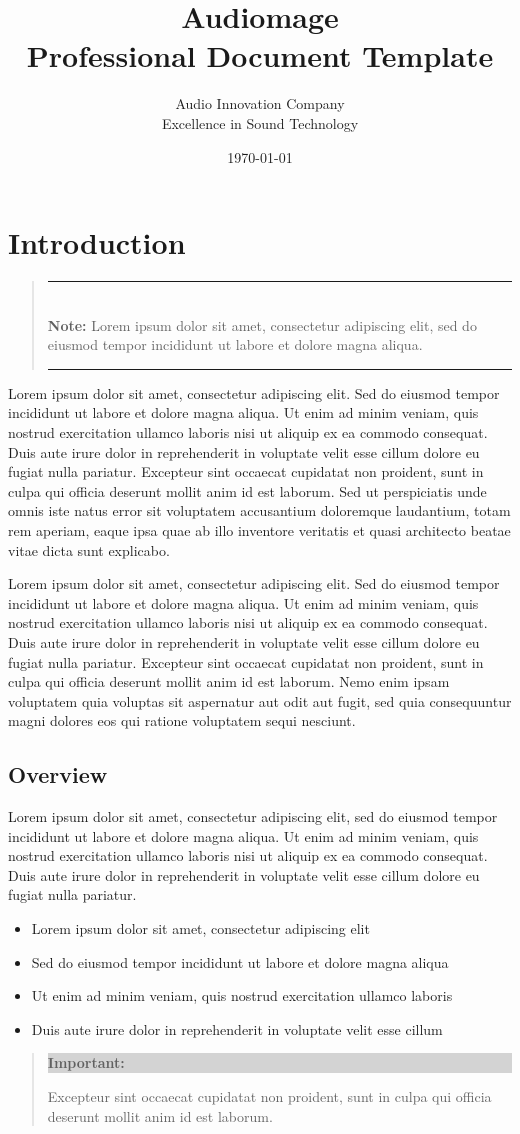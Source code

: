 \documentclass[11pt,a4paper]{article}
\title{
  \vspace{-2cm}
  \textcolor{audiomageblue}{\Huge\bfseries Audiomage}\\
  \vspace{0.5cm}
  \textcolor{secondary}{\Large Professional Document Template}
  \vspace{1cm}
}
\author{
  \textcolor{secondary}{\Large Audio Innovation Company}\\
  \textcolor{secondary}{\normalsize Excellence in Sound Technology}
}
\date{\textcolor{secondary}{\today}}
\newcommand{\loremtext}[1]{%
  Lorem ipsum dolor sit amet, consectetur adipiscing elit. Sed do eiusmod tempor incididunt ut labore et dolore magna aliqua. Ut enim ad minim veniam, quis nostrud exercitation ullamco laboris nisi ut aliquip ex ea commodo consequat. Duis aute irure dolor in reprehenderit in voluptate velit esse cillum dolore eu fugiat nulla pariatur. Excepteur sint occaecat cupidatat non proident, sunt in culpa qui officia deserunt mollit anim id est laborum.%
}
\newenvironment{keypoint}%
{\begin{quote}\textcolor{audiomageblue}{\rule{\textwidth}{1pt}}\vspace{0.2em}\\\textbf{Note:} }%
{\vspace{0.2em}\\\textcolor{audiomageblue}{\rule{\textwidth}{1pt}}\end{quote}}
\newenvironment{highlight}%
{\begin{quote}\colorbox{lightgray}{\parbox{\dimexpr\linewidth-2\fboxsep}{\textbf{Important:} }}}%
{\end{quote}}
\begin{document}
\maketitle
\thispagestyle{empty}

\newpage
\tableofcontents
\newpage

\section{Introduction}

\begin{keypoint}
Lorem ipsum dolor sit amet, consectetur adipiscing elit, sed do eiusmod tempor incididunt ut labore et dolore magna aliqua.
\end{keypoint}

\loremtext{1} Sed ut perspiciatis unde omnis iste natus error sit voluptatem accusantium doloremque laudantium, totam rem aperiam, eaque ipsa quae ab illo inventore veritatis et quasi architecto beatae vitae dicta sunt explicabo. 

\loremtext{2} Nemo enim ipsam voluptatem quia voluptas sit aspernatur aut odit aut fugit, sed quia consequuntur magni dolores eos qui ratione voluptatem sequi nesciunt.

\subsection{Overview}

Lorem ipsum dolor sit amet, consectetur adipiscing elit, sed do eiusmod tempor incididunt ut labore et dolore magna aliqua. Ut enim ad minim veniam, quis nostrud exercitation ullamco laboris nisi ut aliquip ex ea commodo consequat. Duis aute irure dolor in reprehenderit in voluptate velit esse cillum dolore eu fugiat nulla pariatur.

\begin{itemize}
  \item Lorem ipsum dolor sit amet, consectetur adipiscing elit
  \item Sed do eiusmod tempor incididunt ut labore et dolore magna aliqua
  \item Ut enim ad minim veniam, quis nostrud exercitation ullamco laboris
  \item Duis aute irure dolor in reprehenderit in voluptate velit esse cillum
\end{itemize}

\begin{highlight}
Excepteur sint occaecat cupidatat non proident, sunt in culpa qui officia deserunt mollit anim id est laborum.
\end{highlight}
\end{document}
